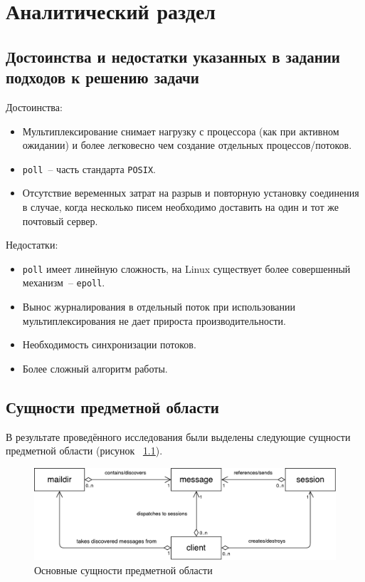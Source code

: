 \documentclass[a4paper,12pt]{report}
\begin{document}
\chapter{Аналитический раздел}

\section{Достоинства и недостатки указанных в задании подходов к решению задачи}

Достоинства:
\begin{itemize}
\item Мультиплексирование снимает нагрузку с процессора (как при активном
      ожидании) и более легковесно чем создание отдельных процессов/потоков.
\item \texttt{poll}~-- часть стандарта \texttt{POSIX}.
\item Отсутствие веременных затрат на разрыв и повторную установку соединения
      в случае, когда несколько писем необходимо доставить на один и тот же
      почтовый сервер.
\end{itemize}

Недостатки:
\begin{itemize}
\item \texttt{poll} имеет линейную сложность, на Linux существует более
      совершенный механизм~-- \texttt{epoll}.
\item Вынос журналирования в отдельный поток при использовании
      мультиплексирования не дает прироста производительности.
\item Необходимость синхронизации потоков.
\item Более сложный алгоритм работы.
\end{itemize}

\section{Сущности предметной области}

В результате проведённого исследования были выделены следующие сущности
предметной области (рисунок ~\ref{fig:entities}).

\begin{figure}
\centering
\includegraphics[width=\textwidth]{report/entities.pdf}
\caption{Основные сущности предметной области}
\label{fig:entities}
\end{figure}
\end{document}
